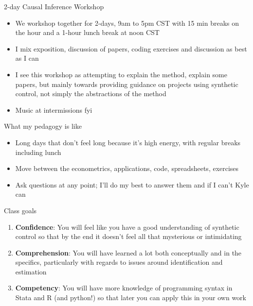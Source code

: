 \documentclass{beamer}
\begin{document}
\begin{frame}{2-day Causal Inference Workshop}

  \begin{itemize}
    \item We workshop together for 2-days, 9am to 5pm CST with 15 min breaks on the hour and a 1-hour lunch break at noon CST
    \item I mix exposition, discussion of papers, coding exercises and discussion as best as I can
    \item I see this workshop as attempting to explain the method, explain some papers, but mainly towards providing guidance on projects using synthetic control, not simply the abstractions of the method 
    \item Music at intermissions fyi
  \end{itemize}

\end{frame}

\begin{frame}{What my pedagogy is like}

\begin{itemize}
\item Long days that don't feel long because it's high energy, with regular breaks including lunch
\item Move between the econometrics, applications, code, spreadsheets, exercises
\item Ask questions at any point; I'll do my best to answer them and if I can't Kyle can
\end{itemize}

\end{frame}



\begin{frame}{Class goals}

  \begin{enumerate}
    \item \textbf{Confidence}: You will feel like you have a good understanding of synthetic control so that by the end it doesn't feel all that mysterious or intimidating
    \item \textbf{Comprehension}: You will have learned a lot both conceptually and in the specifics, particularly with regards to issues around identification and estimation
    \item \textbf{Competency}: You will have more knowledge of programming syntax in Stata and R (and python!) so that later you can apply this in your own work
  \end{enumerate}

\end{frame}
\end{document}
